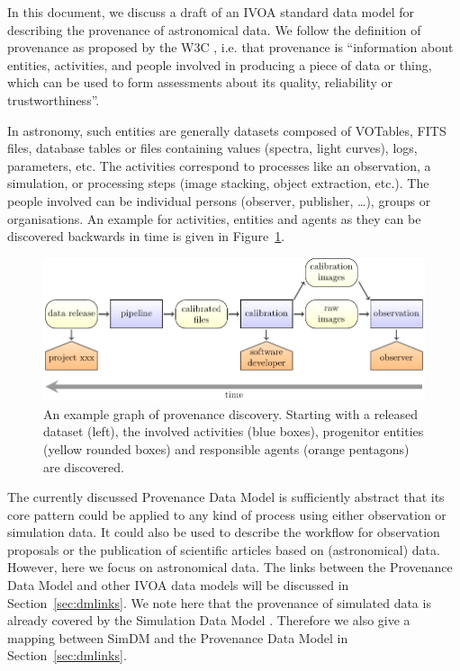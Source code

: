 
In this document, we discuss a draft of an IVOA standard data model for
describing the provenance of astronomical data. 
We follow the definition of provenance as proposed by the W3C \citep{std:W3CProvDM}, i.e. that provenance is ``information about entities, activities, and people involved in producing a piece of data or thing, which can be used to form assessments about its quality, reliability or trustworthiness''.

In astronomy, such entities are generally datasets composed of VOTables, FITS
files, database tables or files containing values (spectra, light curves), logs,
parameters, etc. The activities correspond to processes like an observation, a
simulation, or processing steps (image stacking, object extraction, etc.). The
people involved can be individual persons (observer, publisher, \ldots), groups
or organisations. An example for activities, entities and agents as they can be
discovered backwards in time is given in Figure~\ref{fig:example-workflow}.

\begin{figure}[h]
\centering
\includegraphics[width=1\textwidth]{workflow-backwards.pdf}
\caption[Example graph of provenance discovery]{An example graph of provenance discovery. Starting with a released dataset (left), the involved activities (blue boxes), 
progenitor entities (yellow rounded boxes) and responsible agents (orange pentagons) are 
discovered.}
\label{fig:example-workflow}
\end{figure}


The currently discussed Provenance Data Model is sufficiently abstract that its core pattern could be applied to any kind of process using either observation or simulation data.
It could also be used to describe the workflow for observation proposals or the publication of scientific articles based on (astronomical) data. However, here we focus on astronomical data. The links between the Provenance Data Model and other IVOA data models 
will be discussed in Section~\ref{sec:dmlinks}. We note here that the provenance of simulated data is already covered by the Simulation Data Model
\citep[SimDM,][]{std:SimDM}. Therefore we also give a mapping between SimDM and the Provenance Data Model in Section~\ref{sec:dmlinks}.


